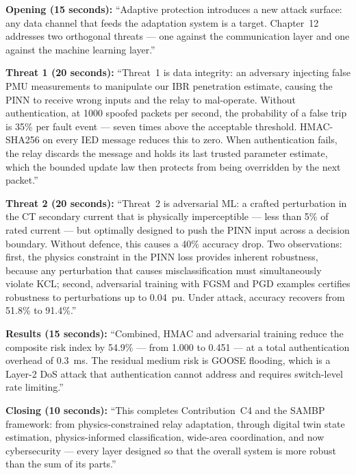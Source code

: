 \documentclass[12pt,a4paper]{article}
\begin{document}
\begin{speakbox}
\textbf{Opening (15 seconds):}
``Adaptive protection introduces a new attack surface: any data channel that feeds the adaptation system is a target. Chapter~12 addresses two orthogonal threats --- one against the communication layer and one against the machine learning layer.''

\medskip
\textbf{Threat 1 (20 seconds):}
``Threat~1 is data integrity: an adversary injecting false PMU measurements to manipulate our IBR penetration estimate, causing the PINN to receive wrong inputs and the relay to mal-operate. Without authentication, at 1000 spoofed packets per second, the probability of a false trip is 35\% per fault event --- seven times above the acceptable threshold. HMAC-SHA256 on every IED message reduces this to zero. When authentication fails, the relay discards the message and holds its last trusted parameter estimate, which the bounded update law then protects from being overridden by the next packet.''

\medskip
\textbf{Threat 2 (20 seconds):}
``Threat~2 is adversarial ML: a crafted perturbation in the CT secondary current that is physically imperceptible --- less than 5\% of rated current --- but optimally designed to push the PINN input across a decision boundary. Without defence, this causes a 40\% accuracy drop. Two observations: first, the physics constraint in the PINN loss provides inherent robustness, because any perturbation that causes misclassification must simultaneously violate KCL; second, adversarial training with FGSM and PGD examples certifies robustness to perturbations up to 0.04~pu. Under attack, accuracy recovers from 51.8\% to 91.4\%.''

\medskip
\textbf{Results (15 seconds):}
``Combined, HMAC and adversarial training reduce the composite risk index by 54.9\% --- from 1.000 to 0.451 --- at a total authentication overhead of 0.3~ms. The residual medium risk is GOOSE flooding, which is a Layer-2 DoS attack that authentication cannot address and requires switch-level rate limiting.''

\medskip
\textbf{Closing (10 seconds):}
``This completes Contribution~C4 and the SAMBP framework: from physics-constrained relay adaptation, through digital twin state estimation, physics-informed classification, wide-area coordination, and now cybersecurity --- every layer designed so that the overall system is more robust than the sum of its parts.''
\end{speakbox}
\end{document}
